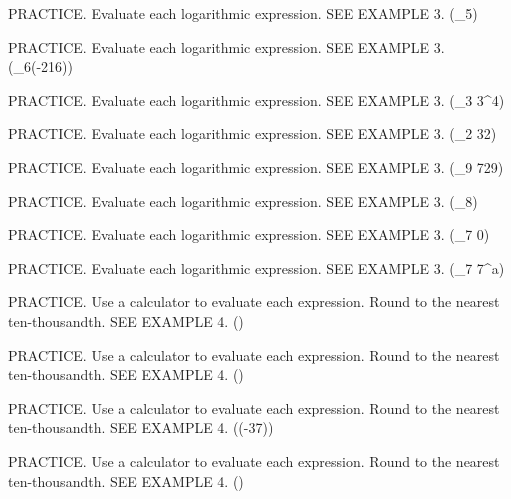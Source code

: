 \documentclass{article}
\newenvironment{practice}[2]{}{}        %
\newcommand{\answer}[1]{}               %
\begin{document}
\begin{practice}{32}{1}
PRACTICE. Evaluate each logarithmic expression. SEE EXAMPLE 3.
(\log_5)
\answer{(-3)}
\end{practice}
\begin{practice}{33}{1}
PRACTICE. Evaluate each logarithmic expression. SEE EXAMPLE 3.
(\log_6(-216))
\answer{undefined}
\end{practice}
\begin{practice}{34}{1}
PRACTICE. Evaluate each logarithmic expression. SEE EXAMPLE 3.
(\log_3 3^4)
\answer{4}
\end{practice}
\begin{practice}{35}{1}
PRACTICE. Evaluate each logarithmic expression. SEE EXAMPLE 3.
(\log_2 32)
\answer{5}
\end{practice}
\begin{practice}{36}{1}
PRACTICE. Evaluate each logarithmic expression. SEE EXAMPLE 3.
(\log_9 729)
\answer{3}
\end{practice}
\begin{practice}{37}{1}
PRACTICE. Evaluate each logarithmic expression. SEE EXAMPLE 3.
(\log_8)
\answer{(-2)}
\end{practice}
\begin{practice}{38}{1}
PRACTICE. Evaluate each logarithmic expression. SEE EXAMPLE 3.
(\log_7 0)
\answer{undefined}
\end{practice}
\begin{practice}{39}{1}
PRACTICE. Evaluate each logarithmic expression. SEE EXAMPLE 3.
(\log_7 7^a)
\answer{(a)}
\end{practice}
\begin{practice}{40}{1}
PRACTICE. Use a calculator to evaluate each expression. Round to the nearest ten-thousandth. SEE EXAMPLE 4.
()
\answer{1.8949}
\end{practice}
\begin{practice}{41}{1}
PRACTICE. Use a calculator to evaluate each expression. Round to the nearest ten-thousandth. SEE EXAMPLE 4.
()
\answer{(-0.6198)}
\end{practice}
\begin{practice}{42}{1}
PRACTICE. Use a calculator to evaluate each expression. Round to the nearest ten-thousandth. SEE EXAMPLE 4.
(\ln(-37))
\answer{undefined}
\end{practice}
\begin{practice}{43}{1}
PRACTICE. Use a calculator to evaluate each expression. Round to the nearest ten-thousandth. SEE EXAMPLE 4.
()
\answer{3.7257}
\end{practice}
\end{document}
